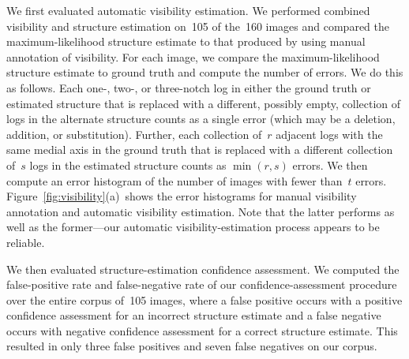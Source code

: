 We first evaluated automatic visibility estimation.
%
We performed combined visibility and structure estimation on~105 of the~160
images and compared the maximum-likelihood structure estimate to that produced
by  using manual annotation of visibility.
%
For each image, we compare the maximum-likelihood structure estimate to ground
truth and compute the number of errors.
%
We do this as follows.
%
Each one-, two-, or three-notch log in either the ground truth or estimated structure
that is replaced with a different, possibly empty, collection of logs in the
alternate structure counts as a single error (which may be a deletion,
addition, or substitution).
%
Further, each collection of~$r$ adjacent logs with the same medial axis in
the ground truth that is replaced with a different collection of~$s$ logs in
the estimated structure counts as $\min(r,s)$ errors.
%
We then compute an error histogram of the number of images with fewer than~$t$
errors.
%
Figure~\ref{fig:visibility}(a)~shows the error histograms for manual visibility
annotation and automatic visibility estimation.
%
Note that the latter performs as well as the former---our automatic
visibility-estimation process appears to be reliable.

We then evaluated structure-estimation confidence assessment.
%
We computed the false-positive rate and false-negative rate of our
confidence-assessment procedure over the entire corpus of~105 images, where a
false positive occurs with a positive confidence assessment for an
incorrect structure estimate and a false negative occurs with negative
confidence assessment for a correct structure estimate.
%
This resulted in only three false positives and seven false negatives on our corpus.

